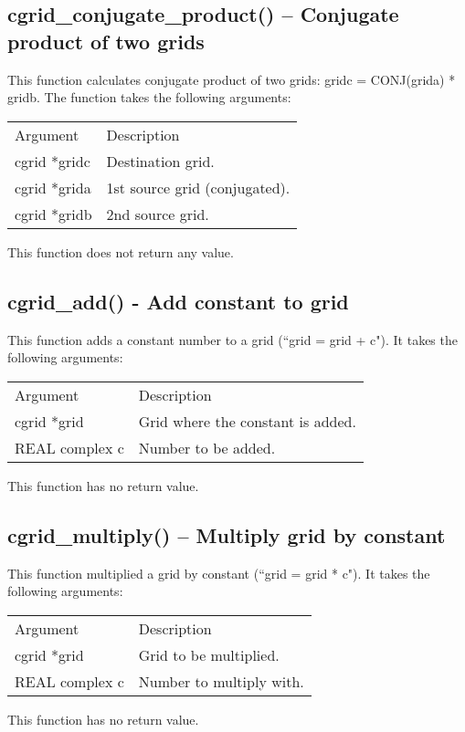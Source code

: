 \documentclass[12pt,letterpaper]{report}
\begin{document}
\subsection{cgrid\_conjugate\_product() -- Conjugate product of two grids}

This function calculates conjugate product of two grids: gridc = CONJ(grida) * gridb. The function takes the following arguments: 
\begin{longtable}{p{} p{}}
Argument & Description\\
\cline{1-2}                                                                                                                                                                                                               
cgrid *gridc & Destination grid.\\                                                                                          
cgrid *grida & 1st source grid (conjugated).\\                                                                                            
cgrid *gridb & 2nd source grid.\\                                                                                            
\end{longtable}
\noindent
This function does not return any value.

\subsection{cgrid\_add() - Add constant to grid}

This function adds a constant number to a grid (``grid = grid + c"). It takes the following arguments:
\begin{longtable}{p{} p{}}
Argument & Description\\
\cline{1-2}
cgrid *grid & Grid where the constant is added.\\
REAL complex c & Number to be added.\\
\end{longtable}
\noindent
This function has no return value.

\subsection{cgrid\_multiply() -- Multiply grid by constant}

This function multiplied a grid by constant (``grid = grid * c"). It takes the following arguments:
\begin{longtable}{p{} p{}}
Argument & Description\\
\cline{1-2}
cgrid *grid & Grid to be multiplied.\\
REAL complex c & Number to multiply with.\\
\end{longtable}
\noindent
This function has no return value.
\end{document}
